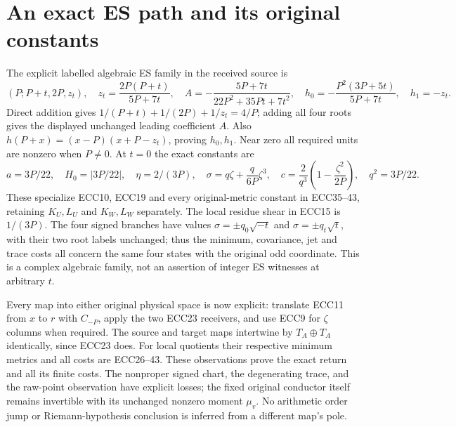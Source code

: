 \documentclass[11pt]{article}
\begin{document}
\section{An exact ES path and its original constants}
The explicit labelled algebraic ES family in the received source is
\begin{equation}
 (P;P+t,2P,z_t),\quad z_t=\frac{2P(P+t)}{5P+7t},\quad
 A=-\frac{5P+7t}{22P^2+35Pt+7t^2},\quad
 h_0=-\frac{P^2(3P+5t)}{5P+7t},\quad h_1=-z_t.
 \tag{ECC44}
\end{equation}
Direct addition gives
$1/(P+t)+1/(2P)+1/z_t=4/P$; adding all four roots gives the displayed
unchanged leading coefficient $A$. Also
$h(P+x)=(x-P)(x+P-z_t)$, proving $h_0,h_1$. Near zero all required
units are nonzero when $P\ne0$. At $t=0$ the exact constants are
\begin{equation}
 a=3P/22,\quad H_0=|3P/22|,\quad\eta=2/(3P),\quad
 \sigma=q\zeta+\frac q{6P}\zeta^3,\quad
 c=\frac2{q^3}\left(1-\frac{\zeta^2}{2P}\right),\quad q^2=3P/22.
 \tag{ECC45}
\end{equation}
These specialize ECC10, ECC19 and every original-metric constant in
ECC35--43, retaining $K_U,L_U$ and $K_W,L_W$ separately. The local residue
shear in ECC15 is $1/(3P)$. The four signed branches have values
$\sigma=\pm q_0\sqrt{-t}$ and $\sigma=\pm q_t\sqrt t$, with their two
root labels unchanged; thus the minimum, covariance, jet and trace costs
all concern the same four states with the original odd coordinate.
This is a complex algebraic family, not an assertion of integer ES
witnesses at arbitrary $t$.

Every map into either original physical space is now explicit:
translate ECC11 from $x$ to $r$ with $C_{-P}$, apply the two ECC23
receivers, and use ECC9 for $\zeta$ columns when required. The source and
target maps intertwine by $T_A\oplus T_A$ identically, since ECC23 does.
For local quotients their respective minimum metrics and all costs are
ECC26--43. These observations prove the exact return and all its finite
costs. The nonproper signed chart, the degenerating trace, and the
raw-point observation have explicit losses; the fixed original conductor
itself remains invertible with its unchanged nonzero moment $\mu_v$.
No arithmetic order jump or Riemann-hypothesis conclusion is inferred
from a different map's pole.
\end{document}
